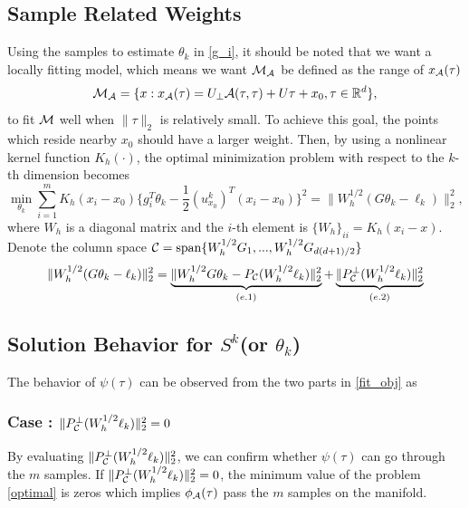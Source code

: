 \documentclass[aos,preprint]{imsart}
\theoremstyle{remark}
\begin{document}
\subsection{Sample Related Weights}
Using the samples to estimate $\theta_k$ in \eqref{g_i}, it should be noted that we want a locally fitting model, which means we want ${\cal M_A}$ be defined as the range of $x_{\cal A}(\tau)$
\begin{equation}\label{M_A}
{\cal M_A} = \{x:x_{\cal A}(\tau) = U_{\perp} {\cal A} (\tau,\tau) + U \tau +x_0,\tau\in {\mathbb R}^d\},
\end{equation}
to fit $\cal M$ well when $\|\tau\|_2$ is relatively small. To achieve this goal, the points which reside nearby $x_0$ should have a larger weight.
Then, by using a nonlinear kernel function $K_h(\cdot)$, the optimal minimization problem with respect to the $k$-th dimension becomes
\begin{equation}\label{optimal}
  \min_{\theta_k} \sum_{i=1}^m K_h(x_i-x_0)\{ g_i^T \theta_k  - \frac{1}{2} {(u^k_{x_0})}^T (x_i -x_0)\}^2
= \|W_h^{1/2}(G \theta_k-\ell_k) \|_2^2,
\end{equation}
where $W_h$ is a diagonal matrix and the $i$-th element is $\{{W_h}\}_{ii} = K_h(x_i-x)$. Denote the column space ${\cal C} = {\rm span}\{ W_h^{1/2}G_1, ...,W_h^{1/2}G_{{d(d+1)}/{2}}\}$
\begin{equation}\label{fit_obj}
\|W_h^{1/2}(G \theta_k-\ell_k) \|_2^2 =\underbrace{ \|W_h^{1/2}G \theta_k - P_{\cal C} (W_h^{1/2}\ell_k)\|_2^2}_{(e.1)}+\underbrace{\|P^{\perp}_{\cal C} (W_h^{1/2}\ell_k)\|_2^2}_{(e.2)}
\end{equation}
\subsection{Solution Behavior for $S^k$(or $\theta_k$)}
The behavior of $\psi(\tau)$ can be observed from the two parts in \eqref{fit_obj} as
\subsubsection*{Case : $\|P^{\perp}_{\cal C} (W_h^{1/2}\ell_k)\|_2^2=0$}
By evaluating $\|P^{\perp}_{\cal C} (W_h^{1/2}\ell_k)\|_2^2$, we can confirm whether $\psi(\tau)$ can go through the $m$ samples. If $\|P^{\perp}_{\cal C} (W_h^{1/2}\ell_k)\|_2^2=0$, the minimum value of the problem \eqref{optimal} is zeros which implies $\phi_{\cal A}(\tau)$ pass the $m$ samples on the manifold.
\end{document}
